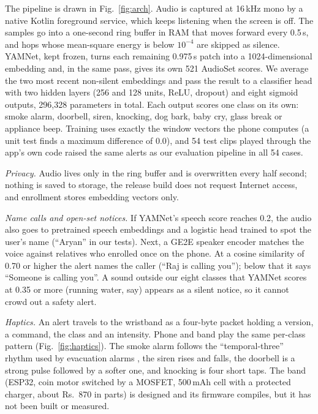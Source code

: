 \documentclass[conference,a4paper]{IEEEtran}
\newcommand{\INR}{Rs.~}
\begin{document}
The pipeline is drawn in Fig.~\ref{fig:arch}. Audio is captured at 16\,kHz mono by a native Kotlin foreground service, which keeps listening when the screen is off. The samples go into a one-second ring buffer in RAM that moves forward every 0.5\,s, and hops whose mean-square energy is below $10^{-4}$ are skipped as silence. YAMNet, kept frozen, turns each remaining 0.975\,s patch into a 1024-dimensional embedding and, in the same pass, gives its own 521 AudioSet scores. We average the two most recent non-silent embeddings and pass the result to a classifier head with two hidden layers (256 and 128 units, ReLU, dropout) and eight sigmoid outputs, 296{,}328 parameters in total. Each output scores one class on its own: smoke alarm, doorbell, siren, knocking, dog bark, baby cry, glass break or appliance beep. Training uses exactly the window vectors the phone computes (a unit test finds a maximum difference of 0.0), and 54 test clips played through the app's own code raised the same alerts as our evaluation pipeline in all 54 cases.

\textit{Privacy.} Audio lives only in the ring buffer and is overwritten every half second; nothing is saved to storage, the release build does not request Internet access, and enrollment stores embedding vectors only.

\textit{Name calls and open-set notices.} If YAMNet's speech score reaches 0.2, the audio also goes to pretrained speech embeddings \cite{lin2020,openwakeword} and a logistic head trained to spot the user's name (``Aryan'' in our tests). Next, a GE2E speaker encoder \cite{wan2018} matches the voice against relatives who enrolled once on the phone. At a cosine similarity of 0.70 or higher the alert names the caller (``Raj is calling you''); below that it says ``Someone is calling you''. A sound outside our eight classes that YAMNet scores at 0.35 or more (running water, say) appears as a silent notice, so it cannot crowd out a safety alert.

\textit{Haptics.} An alert travels to the wristband as a four-byte packet holding a version, a command, the class and an intensity. Phone and band play the same per-class pattern (Fig.~\ref{fig:haptics}). The smoke alarm follows the ``temporal-three'' rhythm used by evacuation alarms \cite{iso8201}, the siren rises and falls, the doorbell is a strong pulse followed by a softer one, and knocking is four short taps. The band (ESP32, coin motor switched by a MOSFET, 500\,mAh cell with a protected charger, about \INR 870 in parts) is designed and its firmware compiles, but it has not been built or measured.
\end{document}
